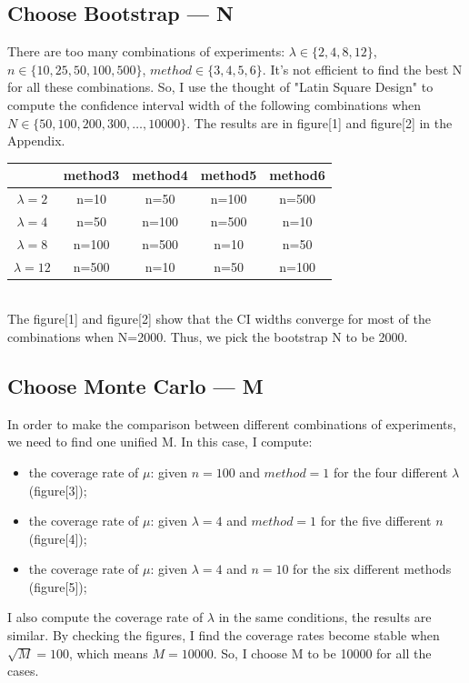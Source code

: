 \documentclass[12pt]{article}
\begin{document}
\subsection{Choose Bootstrap --- N}
There are too many combinations of experiments: $\lambda \in \{2,4,8,12\}$, $n \in \{10,25,50,100,500\}$, $method \in \{3,4,5,6\}$. It's not efficient to find the best N for all these combinations. So, I use the thought of "Latin Square Design" to compute the confidence interval width of the following combinations when $N \in \{50,100,200,300,\dots,10000\}$. The results are in figure[1] and figure[2] in the Appendix.\\

\begin{tabular}{|c|cccc|}
\hline
  & method3 & method4 & method5 & method6\\
 \hline
$\lambda=2$ & n=10 & n=50 & n=100 & n=500 \\
$\lambda=4$ & n=50 & n=100 & n=500 & n=10 \\
$\lambda=8$ & n=100 & n=500 & n=10 & n=50 \\
$\lambda=12$ & n=500 & n=10 & n=50 & n=100\\
\hline
\end{tabular}
\\



The figure[1] and figure[2] show that the CI widths converge for most of the combinations when N=2000. Thus, we pick the bootstrap N to be 2000.\\




\subsection{Choose Monte Carlo --- M}
In order to make the comparison between different combinations of experiments, we need to find one unified M. In this case, I compute:
\begin{itemize}
 \item the coverage rate of $\mu$:  given $n=100$ and $method=1$ for the four different $\lambda$ (figure[3]);
 \item the coverage rate of $\mu$:  given $\lambda=4$ and $method=1$ for the five different $n$ (figure[4]);
 \item the coverage rate of $\mu$:  given $\lambda=4$ and $n=10$  for the six different methods (figure[5]);
 \end{itemize}

I also compute the coverage rate of $\lambda$ in the same conditions, the results are similar. By checking the figures, I find the coverage rates become stable when $\sqrt{M}=100$, which means $M=10000$. So, I choose M to be 10000 for all the cases.\\
\end{document}
